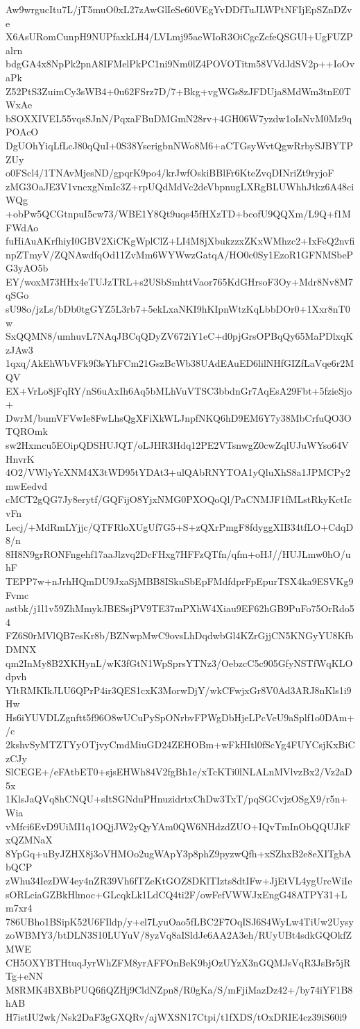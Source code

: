Aw9wrgucItu7L/jT5muO0xL27zAwGlIeSe60VEgYvDDfTuJLWPtNFIjEpSZnDZve
X6AsURomCunpH9NUPfaxkLH4/LVLmj95aeWIoR3OiCgcZcfeQSGUl+UgFUZPalrn
bdgGA4x8NpPk2pnA8IFMelPkPC1ni9Nm0lZ4POVOTitm58VVdJdSV2p++IoOvaPk
Z52PtS3ZuimCy3sWB4+0u62FSrz7D/7+Bkg+vgWGs8zJFDUja8MdWm3tnE0TWxAe
bSOXXIVEL55vqsSJnN/PqxaFBuDMGmN28rv+4GH06W7yzdw1oIsNvM0Mz9qPOAcO
DgUOhYiqLfLcJ80qQuI+0S38YserigbnNWo8M6+aCTGsyWvtQgwRrbySJBYTPZUy
o0FScl4/1TNAvMjesND/gpqrK9po4/krJwfOskiBBlFr6KteZvqDINriZt9ryjoF
zMG3OaJE3V1vncxgNmIc3Z+rpUQdMdVc2deVbpnugLXRgBLUWhhJtkz6A48ciWQg
+obPw5QCGtnpuI5cw73/WBE1Y8Qt9uqs45fHXzTD+bcofU9QQXm/L9Q+f1MFWdAo
fuHiAuAKrfhiyI0GBV2XiCKgWplClZ+LI4M8jXbukzzxZKxWMhzc2+IxFeQ2nvfi
npZTmyV/ZQNAwdfqOd11ZvMm6WYWwzGatqA/HO0c0Sy1EzoR1GFNMSbePG3yAO5b
EY/woxM73HHx4eTUJzTRL+s2USbSmhttVaor765KdGHrsoF3Oy+Mdr8Nv8M7qSGo
sU98o/jzLs/bDb0tgGYZ5L3rb7+5ekLxaNKI9hKIpnWtzKqLbbDOr0+1Xxr8nT0w
SxQQMN8/umhuvL7NAqJBCqQDyZV672iY1eC+d0pjGrsOPBqQy65MaPDlxqKzJAw3
1qxq/AkEhWbVFk9f3sYhFCm21GszBcWb38UAdEAuED6lilNHfGIZfLaVqe6r2MQV
EX+VrLo8jFqRY/nS6uAxIh6Aq5bMLhVuVTSC3bbdnGr7AqEsA29Fbt+5fzieSjo+
DwrM/bumVFVwIe8FwLhsQgXFiXkWLJnpfNKQ6hD9EM6Y7y38MbCrfuQO3OTQROmk
sw2Hxmcu5EOipQDSHUJQT/oLJHR3Hdq12PE2VTsnwgZ0cwZqlUJuWYso64VHnvrK
4O2/VWlyYcXNM4X3tWD95tYDAt3+ulQAbRNYTOA1yQluXhS8a1JPMCPy2mwEedvd
cMCT2gQG7Jy8erytf/GQFijO8YjxNMG0PXOQoQl/PaCNMJF1fMLstRkyKctIcvFn
Lecj/+MdRmLYjjc/QTFRloXUgUf7G5+S+zQXrPmgF8fdyggXIB34tfLO+CdqD8/n
8H8N9grRONFngehf17aaJlzvq2DcFHxg7HFFzQTfn/qfm+oHJ//HUJLmw0hO/uhF
TEPP7w+nJrhHQmDU9JxaSjMBB8ISkuSbEpFMdfdprFpEpurTSX4ka9ESVKg9Fvmc
astbk/j1l1v59ZhMmykJBESsjPV9TE37mPXhW4Xiau9EF62hGB9PuFo75OrRdo54
FZ6S0rMVlQB7esKr8b/BZNwpMwC9ovsLhDqdwbGl4KZrGjjCN5KNGyYU8KfbDMNX
qm2InMy8B2XKHynL/wK3fGtN1WpSprsYTNz3/OebzcC5c905GfyNSTfWqKLOdpvh
YItRMKIkJLU6QPrP4ir3QES1cxK3MorwDjY/wkCFwjxGr8V0Ad3ARJ8nKls1i9Hw
Hs6iYUVDLZgnftt5f96O8wUCuPySpONrbvFPWgDbHjeLPcVeU9aSplf1o0DAm+/c
2kshvSyMTZTYyOTjvyCmdMiuGD24ZEHOBm+wFkHItl0fScYg4FUYCsjKxBiCzCJy
SlCEGE+/eFAtbET0+sjsEHWh84V2fgBh1e/xTcKTi0lNLALnMVlvzBx2/Vz2aD5x
1KlsJaQVq8hCNQU+sItSGNduPHnuzidrtxChDw3TxT/pqSGCvjzOSgX9/r5n+Wia
vMfci6EvD9UiMI1q1OQjJW2yQyYAm0QW6NHdzdZUO+IQvTmInObQQUJkFxQZMNaX
8YpGq+uByJZHX8j3oVHMOo2ugWApY3p8phZ9pyzwQfh+xSZhxB2e8eXITgbAbQCP
zWhu34IezDW4ey4nZR39Vh6fTZeKtGOZ8DKlTIzts8dtIFw+JjEtVL4ygUrcWiIe
sORLciaGZBkHlmoc+GLcqkLk1LdCQ4ti2F/owFefVWWJxEngG48ATPY31+Lm7xr4
786UBho1BSipK52U6FIldp/y+el7LyuOao5fLBC2F7OqISJ6S4WyLw4TiUw2Uysy
zoWBMY3/btDLN3S10LUYuV/8yzVq8aISldJe6AA2A3eh/RUyUBt4sdkGQOkfZMWE
CH5OXYBTHtuqJyrWhZFM8yrAFFOnBeK9bjOzUYzX3nGQMJsVqR3JsBr5jRTg+eNN
M8RMK4BXBbPUQ6fiQZHj9CldNZpn8/R0gKa/S/mFjiMazDz42+/by74iYF1B8hAB
H7istIU2wk/Nsk2DaF3gGXQRv/ajWXSN17Ctpi/t1fXDS/tOxDRIE4cz39iS60i9
